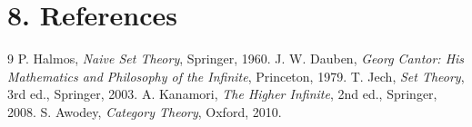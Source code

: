 \section*{8. References}
\begin{thebibliography}{9}
 P. Halmos, \emph{Naive Set Theory}, Springer, 1960.
 J. W. Dauben, \emph{Georg Cantor: His Mathematics and Philosophy of the Infinite}, Princeton, 1979.
 T. Jech, \emph{Set Theory}, 3rd ed., Springer, 2003.
 A. Kanamori, \emph{The Higher Infinite}, 2nd ed., Springer, 2008.
 S. Awodey, \emph{Category Theory}, Oxford, 2010.
\end{thebibliography}
